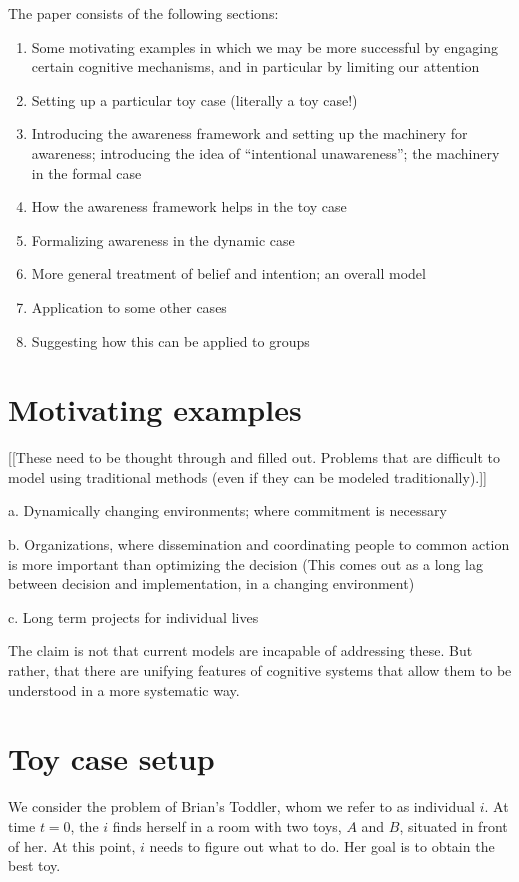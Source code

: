 \documentclass[
11pt,
titlepage,
reqno,
]{article}%
\theoremstyle{definition}
\begin{document}
The paper consists of the following sections:
	
\begin{enumerate}
	\item Some motivating examples in which we may be more successful by engaging certain cognitive mechanisms, and in particular by limiting our attention
	\item Setting up a particular toy case (literally a toy case!)
	\item Introducing the awareness framework and setting up the machinery for awareness; introducing the idea of ``intentional unawareness''; the machinery in the formal case
	\item How the awareness framework helps in the toy case
	\item Formalizing awareness in the dynamic case
	\item More general treatment of belief and intention; an overall model
	\item Application to some other cases
	\item Suggesting how this can be applied to groups
\end{enumerate}
	
\section{Motivating examples}
	
[[These need to be thought through and filled out. Problems that are difficult to model using traditional methods (even if they can be modeled traditionally).]]

a.	Dynamically changing environments; where commitment is necessary

b.	Organizations, where dissemination and coordinating people to common action is more important than optimizing the decision
(This comes out as a long lag between decision and implementation, in a changing environment)

c.	Long term projects for individual lives
	
The claim is not that current models are incapable of addressing these.
But rather, that there are unifying features of cognitive systems that allow them to be understood in a more systematic way.
	
\section{Toy case setup}

We consider the problem of Brian's Toddler, whom we refer to as individual $i$. At time $t=0$, the $i$ finds herself in a room with two toys, $A$ and $B$, situated in front of her. At this point, $i$ needs to figure out what to do. Her goal is to obtain the best toy.
\end{document}

